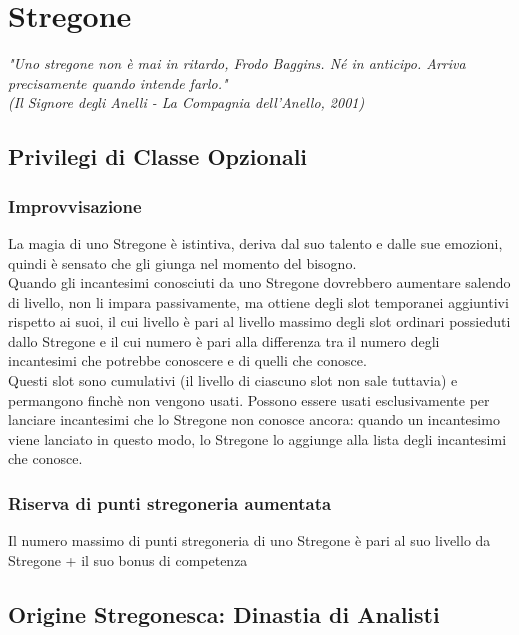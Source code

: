 \chapter{Stregone}

\begin{DndReadAloud}
    \it
    "Uno stregone non è mai in ritardo, Frodo Baggins. Né in anticipo. Arriva precisamente quando intende farlo." \\ (Il Signore degli Anelli - La Compagnia dell'Anello, 2001)
  \end{DndReadAloud}

\section{Privilegi di Classe Opzionali}

\subsection{Improvvisazione}

La magia di uno Stregone è istintiva, deriva dal suo talento e dalle sue emozioni, quindi è sensato che gli giunga nel momento del bisogno. \\ Quando gli incantesimi conosciuti da uno Stregone dovrebbero aumentare salendo di livello, non li impara passivamente, ma ottiene degli slot temporanei aggiuntivi rispetto ai suoi, il cui livello è pari al livello massimo degli slot ordinari possieduti dallo Stregone e il cui numero è pari alla differenza tra il numero degli incantesimi che potrebbe conoscere e di quelli che conosce. \\ Questi slot sono cumulativi (il livello di ciascuno slot non sale tuttavia) e permangono finchè non vengono usati. Possono essere usati esclusivamente per lanciare incantesimi che lo Stregone non conosce ancora: quando un incantesimo viene lanciato in questo modo, lo Stregone lo aggiunge alla lista degli incantesimi che conosce.

\subsection{Riserva di punti stregoneria aumentata}

Il numero massimo di punti stregoneria di uno Stregone è pari al suo livello da Stregone + il suo bonus di competenza

\section{Origine Stregonesca: Dinastia di Analisti}

